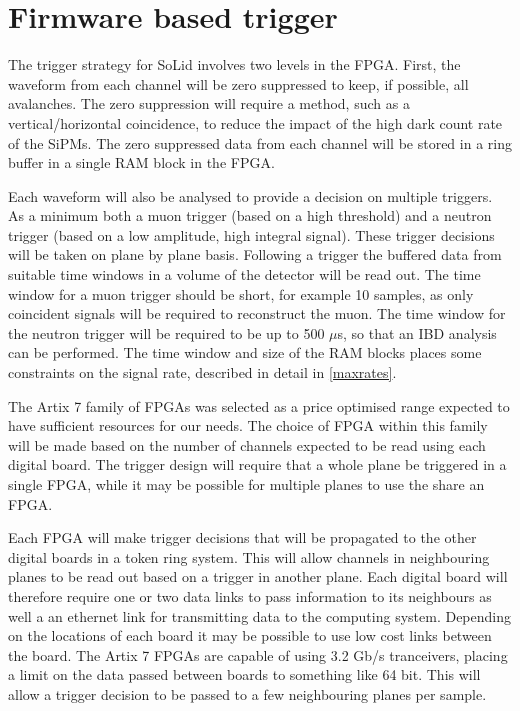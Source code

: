 \documentclass[a4paper]{article}
\begin{document}
\section{Firmware based trigger}

The trigger strategy for SoLid involves two levels in the FPGA.
First, the waveform from each channel will be zero suppressed to keep, if possible, all avalanches.
The zero suppression will require a method, such as a vertical/horizontal coincidence, to reduce the impact of the high dark count rate of the SiPMs.
The zero suppressed data from each channel will be stored in a ring buffer in a single RAM block in the FPGA.

Each waveform will also be analysed to provide a decision on multiple triggers.
As a minimum both a muon trigger (based on a high threshold) and a neutron trigger (based on a low amplitude, high integral signal).
These trigger decisions will be taken on plane by plane basis.
Following a trigger the buffered data from suitable time windows in a volume of the detector will be read out.
The time window for a muon trigger should be short, for example 10 samples, as only coincident signals will be required to reconstruct the muon.
The time window for the neutron trigger will be required to be up to 500 $\mu$s, so that an IBD analysis can be performed.
The time window and size of the RAM blocks places some constraints on the signal rate, described in detail in \cref{maxrates}.

The Artix 7 family of FPGAs was selected as a price optimised range expected to have sufficient resources for our needs.
The choice of FPGA within this family will be made based on the number of channels expected to be read using each digital board.
The trigger design will require that a whole plane be triggered in a single FPGA, while it may be possible for multiple planes to use the share an FPGA.

Each FPGA will make trigger decisions that will be propagated to the other digital boards in a token ring system.
This will allow channels in neighbouring planes to be read out based on a trigger in another plane.
Each digital board will therefore require one or two data links to pass information to its neighbours as well a an ethernet link for transmitting data to the computing system.
Depending on the locations of each board it may be possible to use low cost links between the board.
The Artix 7 FPGAs are capable of using 3.2 Gb/s tranceivers, placing a limit on the data passed between boards to something like 64 bit.
This will allow a trigger decision to be passed to a few neighbouring planes per sample.
\end{document}
